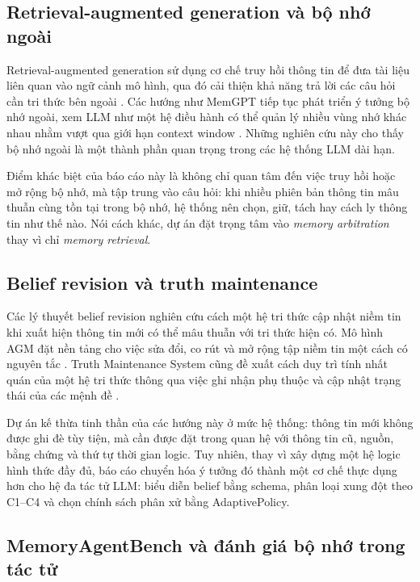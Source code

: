 \documentclass[12pt,a4paper]{article}
\begin{document}
\subsection{Retrieval-augmented generation và bộ nhớ ngoài}

Retrieval-augmented generation sử dụng cơ chế truy hồi thông tin để đưa tài liệu liên quan vào ngữ cảnh mô hình, qua đó cải thiện khả năng trả lời các câu hỏi cần tri thức bên ngoài \cite{lewis2020rag}. Các hướng như MemGPT tiếp tục phát triển ý tưởng bộ nhớ ngoài, xem LLM như một hệ điều hành có thể quản lý nhiều vùng nhớ khác nhau nhằm vượt qua giới hạn context window \cite{packer2023memgpt}. Những nghiên cứu này cho thấy bộ nhớ ngoài là một thành phần quan trọng trong các hệ thống LLM dài hạn.

Điểm khác biệt của báo cáo này là không chỉ quan tâm đến việc truy hồi hoặc mở rộng bộ nhớ, mà tập trung vào câu hỏi: khi nhiều phiên bản thông tin mâu thuẫn cùng tồn tại trong bộ nhớ, hệ thống nên chọn, giữ, tách hay cách ly thông tin như thế nào. Nói cách khác, dự án đặt trọng tâm vào \textit{memory arbitration} thay vì chỉ \textit{memory retrieval}.

\subsection{Belief revision và truth maintenance}

Các lý thuyết belief revision nghiên cứu cách một hệ tri thức cập nhật niềm tin khi xuất hiện thông tin mới có thể mâu thuẫn với tri thức hiện có. Mô hình AGM đặt nền tảng cho việc sửa đổi, co rút và mở rộng tập niềm tin một cách có nguyên tắc \cite{agm1985}. Truth Maintenance System cũng đề xuất cách duy trì tính nhất quán của một hệ tri thức thông qua việc ghi nhận phụ thuộc và cập nhật trạng thái của các mệnh đề \cite{doyle1979}.

Dự án kế thừa tinh thần của các hướng này ở mức hệ thống: thông tin mới không được ghi đè tùy tiện, mà cần được đặt trong quan hệ với thông tin cũ, nguồn, bằng chứng và thứ tự thời gian logic. Tuy nhiên, thay vì xây dựng một hệ logic hình thức đầy đủ, báo cáo chuyển hóa ý tưởng đó thành một cơ chế thực dụng hơn cho hệ đa tác tử LLM: biểu diễn belief bằng schema, phân loại xung đột theo C1--C4 và chọn chính sách phân xử bằng AdaptivePolicy.

\subsection{MemoryAgentBench và đánh giá bộ nhớ trong tác tử}
\end{document}
